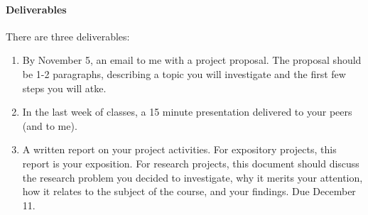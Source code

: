 \documentclass[11pt]{article}
\theoremstyle{definition}
\begin{document}
\paragraph{Deliverables}
There are three deliverables:
\begin{enumerate}
\item By November 5, an email to me with a project proposal. The proposal should be 1-2 paragraphs, describing a topic you will investigate and the first few steps you will atke.
\item In the last week of classes, a 15 minute presentation delivered to your peers (and to me).
\item A written report on your project activities. For expository projects, this report is your exposition. For research projects, this document should discuss the research problem you decided to investigate, why it merits your attention, how it relates to the subject of the course, and your findings. Due December 11.
\end{enumerate}
\end{document}
